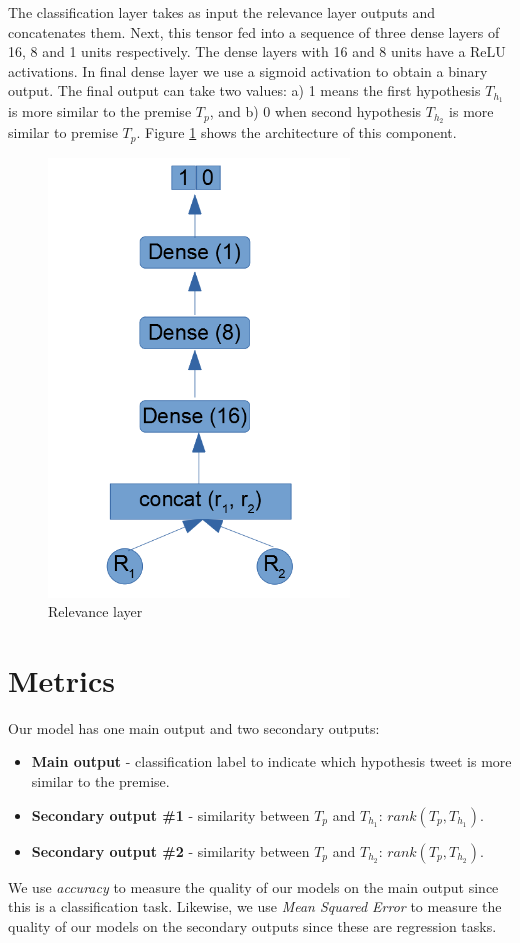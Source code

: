 \documentclass[12pt]{report}
\begin{document}
The classification layer takes as input the relevance layer outputs and concatenates them. Next, this tensor fed into  a sequence of three dense layers of 16, 8 and 1 units respectively. The dense layers with 16 and 8 units have a \ac{ReLU} activations. In final dense layer we use a sigmoid activation to obtain a binary output. The final output can take two values: a) 1 means the first hypothesis $T_{h_1}$ is more similar to the premise $T_p$, and b) 0 when second hypothesis 
$T_{h_2}$ is more similar to premise $T_p$. Figure \ref{figure:classification} shows the architecture of this component.

\begin{figure}[H]	
	\centering
	\includegraphics[width=80mm, scale = 1]{images/15_classification.png}	
	\caption{Relevance layer}	
	\label{figure:classification}
\end{figure}

\section{Metrics}
Our model has one main output and two secondary outputs: 
\begin{itemize}
	\item {\bf Main output}  - classification label to indicate which hypothesis tweet is more similar to the premise. 
	\item {\bf Secondary output \#1} - similarity between $T_p$ and  $T_{h_1}$: $rank(T_p, T_{h_1})$.
	\item {\bf Secondary output \#2} - similarity between $T_p$ and  $T_{h_2}$: $rank(T_p, T_{h_2})$.
\end{itemize} 
We use {\em accuracy} to measure the quality of  our models on the main output  since this is a classification task. Likewise, 
we use  {\em Mean Squared Error} to measure the quality of  our models on the secondary outputs since these are regression tasks. 
\end{document}

